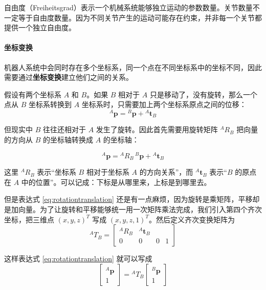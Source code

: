 自由度（Freiheitsgrad）表示一个机械系统能够独立运动的参数数量。关节数量不一定等于自由度数量。因为不同关节产生的运动可能存在约束，并非每一个关节都提供一个独立自由度。

\paragraph{坐标变换}

机器人系统中会同时存在多个坐标系，同一个点在不同坐标系中的坐标不同，因此需要通过\textbf{坐标变换}建立他们之间的关系。

假设有两个坐标系 \(A\) 和 \(B\)。如果 \(B\) 相对于 \(A\) 只是移动了，没有旋转，那么一个点从 \(B\) 坐标系转换到 \(A\) 坐标系时，只需要加上两个坐标系原点之间的位移：
\begin{equation}
    {}^A\mathbf p={}^B\mathbf p+{}^A\mathbf t_B
\end{equation}

但现实中 \(B\) 往往还相对于 \(A\) 发生了旋转。因此首先需要用旋转矩阵 \({}^A R_B\) 把向量的方向从 \(B\) 的坐标轴转换成 \(A\) 的坐标轴：

\begin{equation}
    \label{eq:rotationtranslation}
    {}^A\mathbf p={}^A R_B\,{}^B\mathbf p+{}^A\mathbf t_B
\end{equation}

这里 ${}^A R_B$ 表示“坐标系 \(B\) 相对于坐标系 \(A\) 的方向关系”，而 ${}^A\mathbf t_B$ 表示“\(B\) 的原点在 \(A\) 中的位置”。可以记成：下标是从哪里来，上标是到哪里去。

但是表达式 \ref{eq:rotationtranslation} 还是有一点麻烦，因为旋转是乘矩阵，平移却是加向量。为了让旋转和平移能够统一用一次矩阵乘法完成，我们引入第四个齐次坐标，把三维点 \((x,y,z)^T\) 写成 \((x,y,z,1)^T\)。然后定义齐次变换矩阵为
\begin{equation}
    {}^A T_B=
    \begin{bmatrix}
        {}^A R_B & {}^A\mathbf t_B\\
        0&0&0&1
    \end{bmatrix}
\end{equation}

这样表达式 \ref{eq:rotationtranslation} 就可以写成
\begin{equation}
    \begin{bmatrix}
        {}^A\mathbf p\\
        1
    \end{bmatrix}
    ={}^A T_B
    \begin{bmatrix}
        {}^B\mathbf p\\
        1
    \end{bmatrix}
\end{equation}

